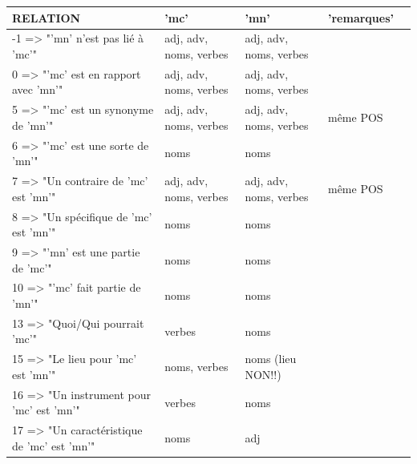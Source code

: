 \documentclass{beamer}
\begin{document}
\begin{frame}
\begin{center}
        \begin{tabular}{ | l | l | l | l | p{5cm} |}
        \hline
RELATION &	'mc' & 'mn'	& 'remarques' \\ \hline
-1 => "'mn' n'est pas lié à 'mc'" &	adj, adv, noms, verbes & adj, adv, noms, verbes	& \\ \hline
0 =>  "'mc' est en rapport avec 'mn'" & adj, adv, noms, verbes & adj, adv, noms, verbes & \\ \hline
5 => "'mc' est un synonyme de 'mn'" & adj, adv, noms, verbes & adj, adv, noms, verbes & même POS \\ \hline
6 => "'mc' est une sorte de 'mn'" & noms & noms & \\ \hline
7 => "Un contraire de 'mc' est 'mn'" & adj, adv, noms, verbes &	adj, adv, noms, verbes & même POS \\ \hline
8 => "Un spécifique de 'mc' est 'mn'" & noms & noms & \\ \hline
9 => "'mn' est une partie de 'mc'" & noms & noms & \\ \hline
10 => "'mc' fait partie de 'mn'" & noms & noms & \\ \hline
13 => "Quoi/Qui pourrait 'mc'" & verbes & noms & \\ \hline
15 => "Le lieu pour 'mc' est 'mn'" & noms, verbes & noms (lieu NON!!) & \\ \hline
16 => "Un instrument pour 'mc' est 'mn'" & verbes & noms & \\ \hline
17 => "Un caractéristique de 'mc' est 'mn'" & noms & adj & \\ \hline
        \end{tabular}
\end{center}
\end{frame}


\begin{frame}

\end{frame}


\begin{frame}

\end{frame}
\end{document}
